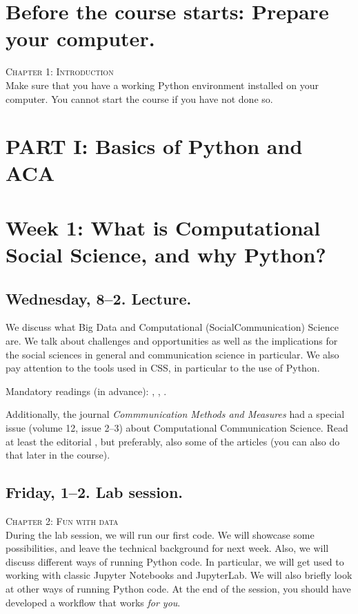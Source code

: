 \section*{Before the course starts: Prepare your computer.}
\textsc{ Chapter 1: Introduction}\\
Make sure that you have a working Python environment installed on your computer. You cannot start the course if you have not done so.

\section*{PART I: Basics of Python and ACA}

\section*{Week 1: What is Computational Social Science, and why Python?}
\subsection*{Wednesday, 8--2. Lecture.}
We discuss what Big Data and Computational (Social\textbar Communication) Science are. We talk about challenges and opportunities as well as the implications for the social sciences in general and communication science in particular. We also pay attention to the tools used in CSS, in particular to the use of Python.

Mandatory readings (in advance):  \cite{boyd2012}, \cite{Kitchin2014}, \cite{Hilbert2019}.

Additionally, the journal \textit{Commmunication Methods and Measures} had a special issue (volume 12, issue 2--3) about Computational Communication Science. Read at least the editorial \citep{VanAtteveldt2018a}, but preferably, also some of the articles (you can also do that later in the course).


\subsection*{Friday, 1--2. Lab session.}
\textsc{ Chapter 2: Fun with data}\\

During the lab session, we will run our first code. We will showcase some possibilities, and leave the technical background for next week. Also, we will discuss different ways of running Python code. In particular, we will get used to working with classic Jupyter Notebooks and JupyterLab. We will also briefly look at other ways of running Python code. At the end of the session, you should have developed a workflow that works \emph{for you}.


